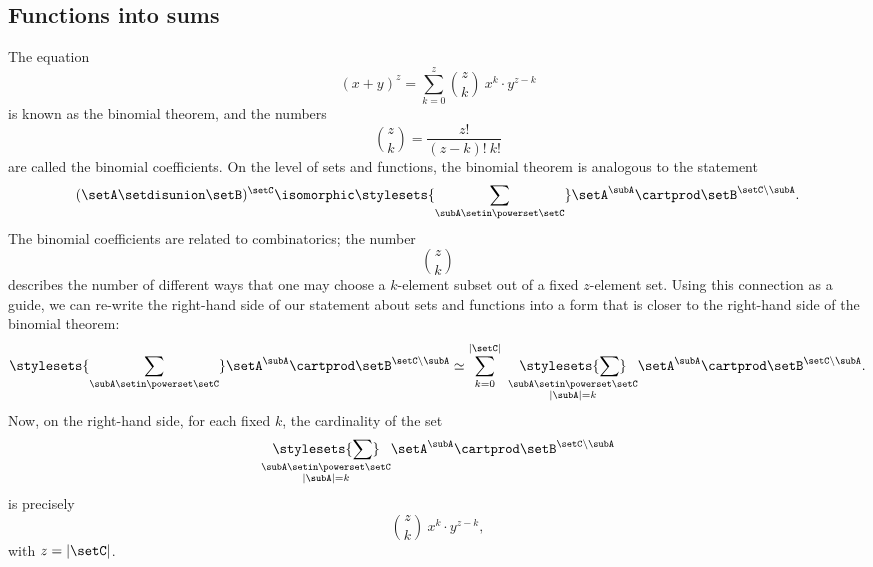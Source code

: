 

\subsection{Functions into sums}

The equation 
\begin{equation}
(x + y)^z = \sum_{k = 0}^z {{z}\choose{k}} \ x^k \cdot y^{z - k}
\end{equation}
is known as the binomial theorem, and the numbers
\begin{equation}
{{z}\choose{k}} = \frac{z!}{(z-k)! \ k!}
\end{equation}
are called the binomial coefficients. On the level of sets and functions, the binomial theorem is analogous to the statement
\begin{equation}
(\setA \setdisunion \setB)^{\setC}  \isomorphic \stylesets{\sum_{\subA \setin \powerset \setC}} \setA^\subA \cartprod \setB^{\setC \backslash \subA}.
\end{equation}
The binomial coefficients are related to combinatorics; the number
\begin{equation}
{{z}\choose{k}}
\end{equation}
describes the number of different ways that one may choose a $k$-element subset out of a fixed $z$-element set. Using this connection as a guide, we can re-write the right-hand side of our statement about sets and functions into a form that is closer to the right-hand side of the binomial theorem: 
\begin{equation}
\stylesets{\sum_{\subA \setin \powerset \setC}} \setA^\subA \cartprod \setB^{\setC \backslash \subA} \simeq \sum_{k = 0}^{\vert \setC \vert} \ \underset{\substack{\subA \setin \powerset \setC \\ \vert \subA \vert = k}}{\stylesets{\sum}} \setA^\subA \cartprod \setB^{\setC \backslash \subA}.
\end{equation}
Now, on the right-hand side, for each fixed $k$, the cardinality of the set 
\begin{equation}
\underset{\substack{\subA \setin \powerset \setC \\ \vert \subA \vert = k}}{\stylesets{\sum}} \setA^\subA \cartprod \setB^{\setC \backslash \subA}
\end{equation}
is precisely 
\begin{equation}
{{z}\choose{k}} \ x^k \cdot y^{z - k},
\end{equation}
with $z = \vert \setC \vert$. 



